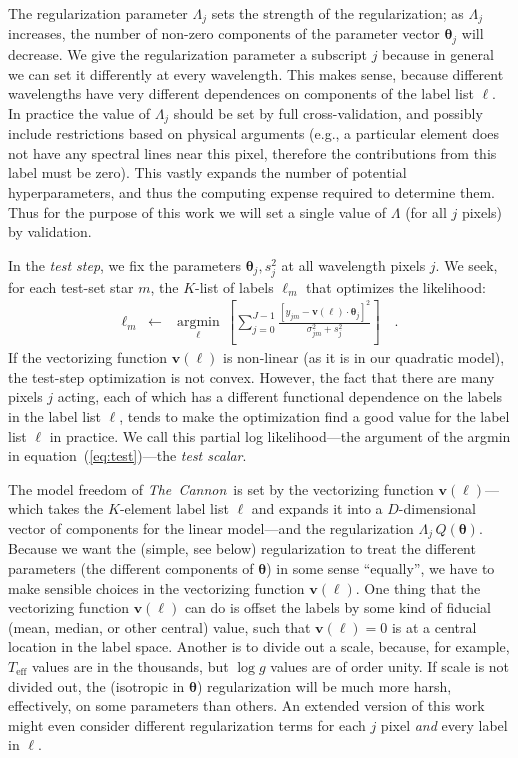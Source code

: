 \documentclass[12pt,preprint]{aastex}
\newcommand{\project}[1]{\textsl{#1}}
\newcommand{\TheCannon}{\project{The~Cannon}}
\newcommand{\logg}{\log g}
\newcommand{\Teff}{T_{\mathrm{eff}}}
\newcommand{\Dvector}[1]{\boldsymbol{#1}}
\newcommand{\vectheta}{\Dvector{\theta}}
\newcommand{\vecv}{\Dvector{v}}
\newcommand{\argmin}[1]{\underset{#1}{\operatorname{argmin}}\,}
\begin{document}
The regularization parameter $\Lambda_j$ sets the strength of the 
regularization; as $\Lambda_j$ increases, the number of non-zero components of 
the parameter vector $\vectheta_j$ will decrease.  We give the regularization 
parameter a subscript $j$ because in general we can set it differently at every
wavelength.  This makes sense, because different wavelengths have very different
dependences on components of the label list $\ell$.  In practice the
value of $\Lambda_j$ should be set by full cross-validation, and possibly 
include restrictions based on physical arguments (e.g., a particular element 
does not have any spectral lines near this pixel, therefore the contributions
from this label must be zero).  This vastly expands the number of potential 
hyperparameters, and thus the computing expense required to determine them.  
Thus for the purpose of this work we will set a single value of $\Lambda$ (for 
all $j$ pixels) by validation.


In the \emph{test step}, we fix the parameters $\vectheta_j,s^2_j$ at all
wavelength pixels $j$.  We seek, for each test-set star $m$, the $K$-list of 
labels $\ell_m$ that optimizes the likelihood:
\begin{eqnarray}\label{eq:test}
  \ell_m &\leftarrow& \argmin{\ell}\left[
    \sum_{j=0}^{J-1} \frac{[y_{jm}-\vecv(\ell)\cdot\vectheta_j]^2}{\sigma^2_{jm}+s^2_j}
    \right]
  \quad .
\end{eqnarray}
If the vectorizing function $\vecv(\ell)$ is non-linear (as it is in our 
quadratic model), the test-step optimization is not convex.  However, the fact
that there are many pixels $j$ acting, each of which has a different functional
dependence on the labels in the label list $\ell$, tends to make the 
optimization find a good value for the label list $\ell$ in practice.  We call
this partial log likelihood---the argument of the argmin in 
equation~(\ref{eq:test})---the \emph{test scalar}.


The model freedom of \TheCannon\ is set by the vectorizing function 
$\vecv(\ell)$---which takes the $K$-element label list $\ell$ and expands it 
into a $D$-dimensional vector of components for the linear model---and the 
regularization $\Lambda_j\,Q(\vectheta)$.  Because we want the (simple, see 
below) regularization to treat the different parameters (the different 
components of $\vectheta$) in some sense ``equally'', we have to make sensible 
choices in the vectorizing function $\vecv(\ell)$.  One thing that the 
vectorizing function $\vecv(\ell)$ can do is offset the labels by some kind of
fiducial (mean, median, or other central) value, such that $\vecv(\ell)=0$ is at
a central location in the label space.  Another is to divide out a scale, 
because, for example, $\Teff$ values are in the thousands, but $\logg$ values
are of order unity.  If scale is not divided out, the (isotropic in $\vectheta$)
regularization will be much more harsh, effectively, on some parameters than 
others.  An extended version of this work might even consider different 
regularization terms for each $j$ pixel \emph{and} every label in $\ell$.
\end{document}
